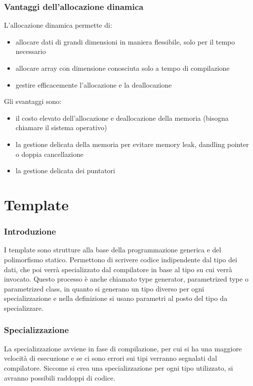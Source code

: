\documentclass[a4paper]{article}
\begin{document}
\subsubsection*{Vantaggi dell'allocazione dinamica}
L'allocazione dinamica permette di:
\begin{itemize}
	\item allocare dati di grandi dimensioni in maniera flessibile, solo per il tempo necessario
	\item allocare array con dimensione conosciuta solo a tempo di compilazione
	\item gestire efficacemente l'allocazione e la deallocazione
\end{itemize}
Gli svantaggi sono:
\begin{itemize}
	\item il costo elevato dell'allocazione e deallocazione della memoria (bisogna chiamare il sistema operativo)
	\item la gestione delicata della memoria per evitare memory leak, dandling pointer o doppia cancellazione
	\item la gestione delicata dei puntatori
\end{itemize}

\newpage

\section{Template}
\subsubsection*{Introduzione}
I template sono strutture alla base della programmazione generica e del polimorfismo statico. Permettono di scrivere codice
indipendente dal tipo dei dati, che poi verrà specializzato dal compilatore in base al tipo su cui verrà invocato. Questo processo
è anche chiamato type generator, parametrized type o parametrized class, in quanto si generano un tipo diverso per ogni
specializzazione e nella definizione si usano parametri al posto del tipo da specializzare.

\subsubsection*{Specializzazione}
La specializzazione avviene in fase di compilazione, per cui si ha una maggiore velocità di esecuzione e se ci sono errori sui
tipi verranno segnalati dal compilatore. Siccome si crea una specializzazione per ogni tipo utilizzato, si avranno possibili
raddoppi di codice.
\end{document}
